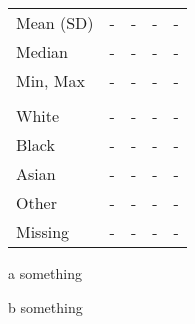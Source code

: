 \documentclass[
]{article}
\begin{document}
\begin{threeparttable}
\begin{tabular}[t]{lllll}
\hspace{1em}Mean (SD) & - & - & - & -\\
\hspace{1em}Median & - & - & - & -\\
\hspace{1em}Min, Max & - & - & - & -\\
\addlinespace[0.3em]
\multicolumn{5}{l}{\textbf{Race}}\\
\hspace{1em}White & - & - & - & -\\
\hspace{1em}Black & - & - & - & -\\
\hspace{1em}Asian & - & - & - & -\\
\hspace{1em}Other & - & - & - & -\\
\hspace{1em}Missing & - & - & - & -\\
\bottomrule
\end{tabular}
\begin{tablenotes}
\small
\item \textit{ } 
\item a something
\item b something
\end{tablenotes}
\end{threeparttable}
\end{document}
